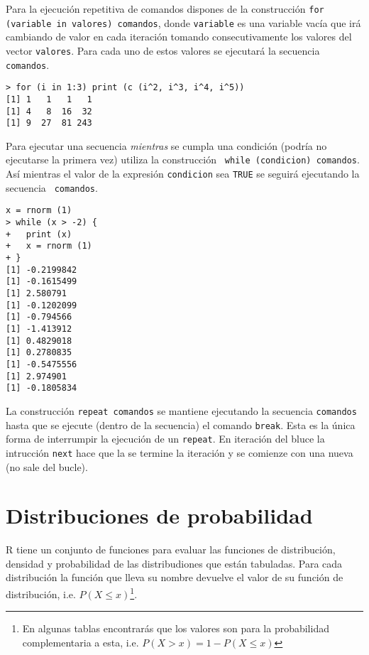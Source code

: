 
Para la ejecución  repetitiva de comandos dispones  de la construcción
{\tt for (variable in valores)  comandos}, donde {\tt variable} es una
variable vacía  que irá cambiando  de valor en cada  iteración tomando
consecutivamente los valores  del vector {\tt valores}.  Para cada uno
de estos valores se ejecutará la secuencia {\tt comandos}.

\begin{verbatim}
> for (i in 1:3) print (c (i^2, i^3, i^4, i^5))
[1] 1   1   1   1
[1] 4   8  16  32
[1] 9  27  81 243
\end{verbatim}


Para ejecutar  una secuencia  {\em mientras}  se cumpla  una condición
(podría no  ejecutarse la  primera vez)  utiliza la  construcción {\tt
while (condicion)  comandos}. Así  mientras el  valor de  la expresión
{\tt condicion} sea {\tt TRUE} se seguirá ejecutando la secuencia {\tt
comandos}.

\begin{verbatim}
x = rnorm (1)
> while (x > -2) {
+   print (x)
+   x = rnorm (1)
+ }
[1] -0.2199842
[1] -0.1615499
[1] 2.580791
[1] -0.1202099
[1] -0.794566
[1] -1.413912
[1] 0.4829018
[1] 0.2780835
[1] -0.5475556
[1] 2.974901
[1] -0.1805834
\end{verbatim}


La  construcción  {\tt  repeat  comandos} se  mantiene  ejecutando  la
secuencia {\tt comandos} hasta que se ejecute (dentro de la secuencia)
el  comando {\tt  break}. Esta  es la  única forma  de interrumpir  la
ejecución de  un {\tt  repeat}. En iteración  del bluce  la intrucción
{\tt next} hace que  la se termine la iteración y  se comienze con una
nueva (no sale del bucle).

\section{Distribuciones de probabilidad}


{\sf R} tiene  un conjunto de funciones para evaluar  las funciones de
distribución, densidad y probabilidad  de las distribudiones que están
tabuladas.  Para cada  distribución  la función  que  lleva su  nombre
devuelve  el valor  de  su  función de  distribución,  i.e. $P(X  \leq
x)$\footnote{En algunas tablas encontrarás que los valores son para la
probabilidad complementaria  a esta,  i.e. $P(X  > x) =  1 -  P(X \leq
x)$}.


